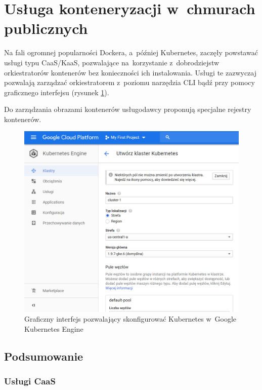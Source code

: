 \documentclass[12pt,a4paper,twoside,titlepage,openright]{book}
\begin{document}
\section{Usługa konteneryzacji w~chmurach publicznych}\label{section:caas}

Na fali ogromnej popularności Dockera, a~później Kubernetes, zaczęły powstawać usługi typu CaaS/KaaS, pozwalające na~korzystanie z~dobrodziejstw orkiestratorów kontenerów bez konieczności ich instalowania. Usługi te zazwyczaj pozwalają zarządzać orkiestratorem z~poziomu narzędzia CLI bądź przy pomocy graficznego interfejsu (rysunek \ref{fig:kubernetes-engine}).

Do zarządzania obrazami kontenerów usługodawcy proponują specjalne rejestry kontenerów.

\begin{figure}[h]
	\centering
			\includegraphics[width=\textwidth]{kubernetes-service.png}
		\caption{Graficzny interfejs pozwalający skonfigurować Kubernetes w~Google Kubernetes Engine}
		\label{fig:kubernetes-engine}
\end{figure}

\subsection*{Podsumowanie}

\subsubsection{Usługi CaaS}
\end{document}

